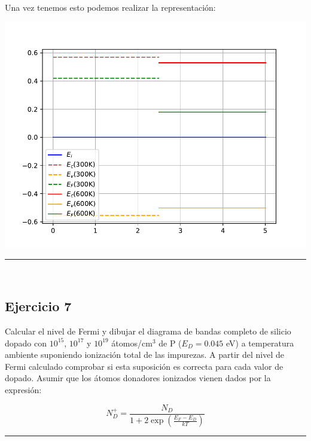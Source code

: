 Una vez tenemos esto podemos realizar la representación:
\begin{center}
	\includegraphics[width=0.9\linewidth]{Cuerpo/Ch_01/Ejercicio_01_7.pdf}
\end{center}


\rule{\textwidth}{0.1pt} \\[2pt]

\subsection{Ejercicio 7}

Calcular el nivel de Fermi y dibujar el diagrama de bandas completo de silicio dopado con $10^{15}$, $10^{17}$ y $10^{19}$ átomos/cm$^3$ de P ($E_D = 0.045$ eV) a temperatura ambiente suponiendo ionización total de las impurezas. A partir del nivel de Fermi calculado comprobar si esta suposición es correcta para cada valor de dopado. Asumir que los átomos donadores ionizados vienen dados por la expresión:

\begin{equation}
	N_D^+ = \frac{N_D}{1 + 2 \exp \left( \frac{E_F - E_D}{kT} \right)}
\end{equation}

\rule{\textwidth}{0.1pt} \\[2pt]

